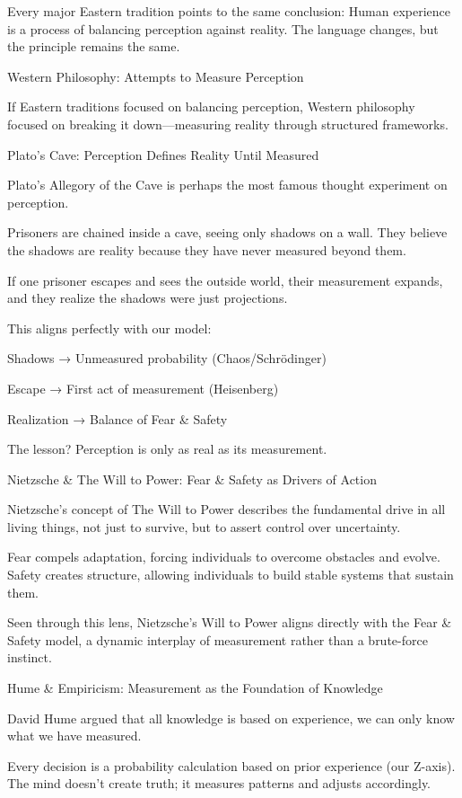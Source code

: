 \documentclass[11pt]{article}
\begin{document}
Every major Eastern tradition points to the same conclusion:
Human experience is a process of balancing perception against reality.
The language changes, but the principle remains the same.

Western Philosophy: Attempts to Measure Perception

If Eastern traditions focused on balancing perception, Western philosophy focused on breaking it down—measuring reality through structured frameworks.

Plato’s Cave: Perception Defines Reality Until Measured

Plato’s Allegory of the Cave is perhaps the most famous thought experiment on perception.

Prisoners are chained inside a cave, seeing only shadows on a wall.
They believe the shadows are reality because they have never measured beyond them.

If one prisoner escapes and sees the outside world, their measurement expands, and they realize the shadows were just projections.

This aligns perfectly with our model:

Shadows → Unmeasured probability (Chaos/Schrödinger)

Escape → First act of measurement (Heisenberg)

Realization → Balance of Fear & Safety

The lesson?
Perception is only as real as its measurement.

Nietzsche & The Will to Power: Fear & Safety as Drivers of Action

Nietzsche’s concept of The Will to Power describes the fundamental drive in all living things, not just to survive, but to assert control over uncertainty.

Fear compels adaptation, forcing individuals to overcome obstacles and evolve.
Safety creates structure, allowing individuals to build stable systems that sustain them.

Seen through this lens, Nietzsche’s Will to Power aligns directly with the Fear & Safety model, 
a dynamic interplay of measurement rather than a brute-force instinct.

Hume & Empiricism: Measurement as the Foundation of Knowledge

David Hume argued that all knowledge is based on experience, we can only know what we have measured.

Every decision is a probability calculation based on prior experience (our Z-axis).
The mind doesn’t create truth; it measures patterns and adjusts accordingly.
\end{document}
